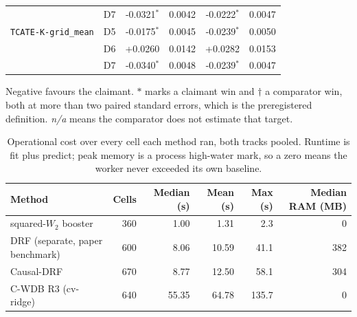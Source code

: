 \begin{table}[htbp]
\begin{tabular}{@{}llrrrr@{}}
 & D7 & -0.0321$^{\ast}$ & 0.0042 & -0.0222$^{\ast}$ & 0.0047 \\
\texttt{TCATE-K-grid\_mean} & D5 & -0.0175$^{\ast}$ & 0.0045 & -0.0239$^{\ast}$ & 0.0050 \\
 & D6 & +0.0260 & 0.0142 & +0.0282 & 0.0153 \\
 & D7 & -0.0340$^{\ast}$ & 0.0048 & -0.0239$^{\ast}$ & 0.0047 \\
\bottomrule
\end{tabular}
\par\vspace{2pt}\parbox{0.96\textwidth}{\scriptsize Negative favours the claimant. $\ast$ marks a claimant win and $\dagger$ a comparator win, both at more than two paired standard errors, which is the preregistered definition. \emph{n/a} means the comparator does not estimate that target.}
\end{table}

\begin{table}[htbp]
\centering
\caption{Operational cost over every cell each method ran, both tracks pooled. Runtime is fit plus predict; peak memory is a process high-water mark, so a zero means the worker never exceeded its own baseline.}
\label{tab:cost-all}
\small
\begin{tabular}{@{}lrrrrr@{}}
\toprule
Method & Cells & Median (s) & Mean (s) & Max (s) & Median RAM (MB) \\
\midrule
squared-$W_2$ booster & 360 & 1.00 & 1.31 & 2.3 & 0 \\
DRF (separate, paper benchmark) & 600 & 8.06 & 10.59 & 41.1 & 382 \\
Causal-DRF & 670 & 8.77 & 12.50 & 58.1 & 304 \\
C-WDB R3 (cv-ridge) & 640 & 55.35 & 64.78 & 135.7 & 0 \\
\bottomrule
\end{tabular}
\end{table}
